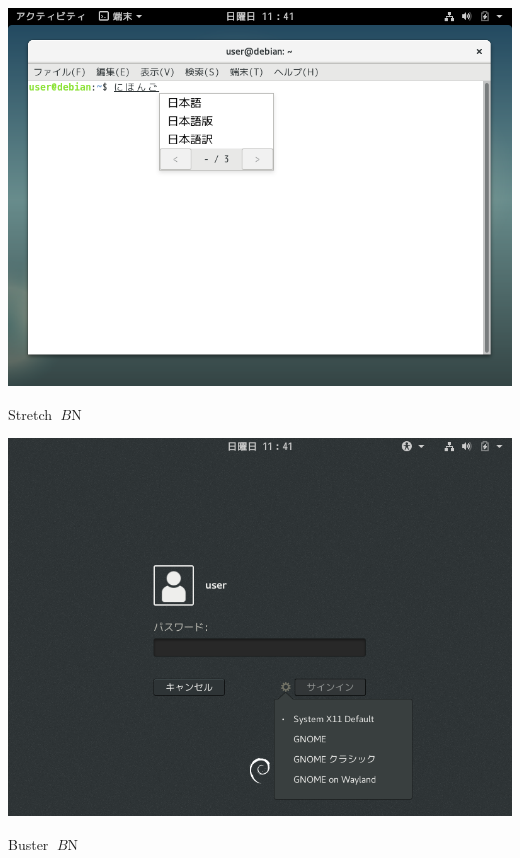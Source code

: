 \documentclass[mingoth,a4paper]{jsarticle}
\begin{document}
{{\begin{center}
\includegraphics[keepaspectratio,width=1\hsize]{image201907/stretch_gnome_3.png}
\end{center}



Stretch $B$N%

\begin{center}
\includegraphics[keepaspectratio,width=1\hsize]{image201907/stretch_gnome_0.png}
\end{center}



Buster $B$N%

}}
\end{document}
